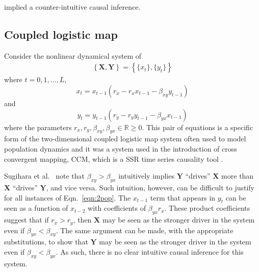 implied a counter-intuitive causal inference.

\subsection{Coupled logistic map}
\label{sec:2Pop}
Consider the nonlinear dynamical system of
\begin{eqnarray}
\label{eqn:2pop}
\left\{\mathbf{X},\mathbf{Y}\right\} = \left\{\{x_t\},\{y_t\}\right\}
\end{eqnarray}
where $t=0,1,\ldots,L$,
\begin{equation*}
x_t = x_{t-1}\left(r_x-r_x x_{t-1}-\beta_{xy} y_{t-1}\right)
\end{equation*}
and
\begin{equation*}
y_t = y_{t-1}\left(r_y-r_y y_{t-1}-\beta_{yx} x_{t-1}\right)
\end{equation*}
where the parameters $r_x,r_y,\beta_{xy},\beta_{yx}\in\mathbb{R}\ge 0$.  This pair of equations is a specific form of the two-dimensional coupled logistic map system often used to model population dynamics \cite{Lloyd1995} and it was a system used in the introduction of cross convergent mapping, CCM, which is a SSR time series causality tool \cite{Sugihara2012}.

Sugihara et al.\ \cite{Sugihara2012} note that $\beta_{xy}>\beta_{yx}$ intuitively implies $\mathbf{Y}$ ``drives'' $\mathbf{X}$ more than $\mathbf{X}$ ``drives'' $\mathbf{Y}$, and vice versa.  Such intuition, however, can be difficult to justify for all instances of Eqn.\ \ref{eqn:2pop}.  The $x_{t-1}$ term that appears in $y_t$ can be seen as a function of $x_{t-2}$ with coefficients of $\beta_{yx}r_x$.  These product coefficients suggest that if $r_x>r_y$, then $\mathbf{X}$ may be seen as the stronger driver in the system even if $\beta_{yx}<\beta_{xy}$.  The same argument can be made, with the appropriate substitutions, to show that $\mathbf{Y}$ may be seen as the stronger driver in the system even if $\beta_{xy}<\beta_{yx}$.  As such, there is no clear intuitive causal inference for this system. 

